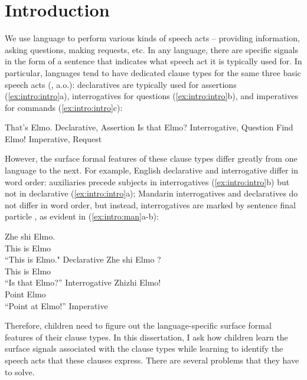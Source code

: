 

\chapter{Introduction}
\label{chap:introduction}

We use language to perform various kinds of speech acts -- providing information, asking questions, making requests, etc. In any language, there are specific signals in the form of a sentence that indicates what speech act it is typically used for. In particular, languages tend to have dedicated clause types for the same three basic speech acts (\citealt{sz1985speechact, konig2007, aikhenvald2016, portner2018}, a.o.): declaratives are typically used for assertions (\ref{ex:intro:intro}a), interrogatives for questions (\ref{ex:intro:intro}b), and imperatives for commands (\ref{ex:intro:intro}c):

\bxl
That's Elmo. \hfill Declarative, Assertion
\ex Is that Elmo? \hfill Interrogative, Question
\ex Find Elmo! \hfill Imperative, Request
\exl
\eex



However, the surface formal features of these clause types differ greatly from one language to the next. For example, English declarative and interrogative differ in word order: auxiliaries precede subjects in interrogatives (\ref{ex:intro:intro}b) but not in declarative (\ref{ex:intro:intro}a); Mandarin interrogatives and declaratives do not differ in word order, but instead, interrogatives are marked by sentence final particle , as evident in (\ref{ex:intro:man}a-b): 

\bxl
\gll Zhe shi Elmo.\\
This is Elmo\\
\trans ``This is Elmo." \hfill Declarative
\ex 
\gll Zhe shi Elmo ?\\
This is Elmo \Sfp\\
\trans ``Is that Elmo?'' \hfill Interrogative
\ex 
\gll Zhizhi Elmo!\\
Point Elmo\\
\trans ``Point at Elmo!'' \hfill Imperative
\exl
\eex

Therefore, children need to figure out the language-specific surface formal features of their clause types. In this dissertation, I ask how children learn the surface signals associated with the clause types while learning to identify the speech acts that these clauses express. There are several problems that they have to solve.

